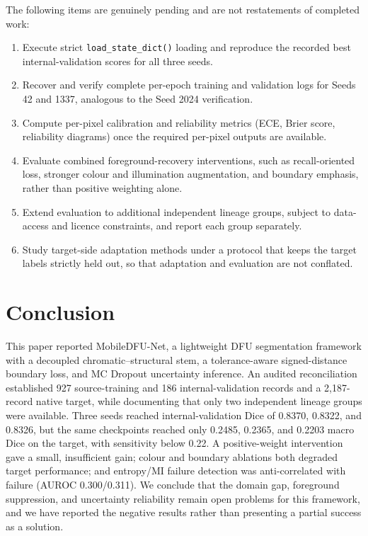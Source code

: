 \documentclass[conference]{IEEEtran}
\begin{document}
The following items are genuinely pending and are not restatements of completed work:
\begin{enumerate}
\item Execute strict \texttt{load\_state\_dict()} loading and reproduce the recorded best internal-validation scores for all three seeds.
\item Recover and verify complete per-epoch training and validation logs for Seeds 42 and 1337, analogous to the Seed 2024 verification.
\item Compute per-pixel calibration and reliability metrics (ECE, Brier score, reliability diagrams) once the required per-pixel outputs are available.
\item Evaluate combined foreground-recovery interventions, such as recall-oriented loss, stronger colour and illumination augmentation, and boundary emphasis, rather than positive weighting alone.
\item Extend evaluation to additional independent lineage groups, subject to data-access and licence constraints, and report each group separately.
\item Study target-side adaptation methods under a protocol that keeps the target labels strictly held out, so that adaptation and evaluation are not conflated.
\end{enumerate}

\section{Conclusion}
\label{sec:conclusion}

This paper reported MobileDFU-Net, a lightweight DFU segmentation framework with a decoupled chromatic--structural stem, a tolerance-aware signed-distance boundary loss, and MC Dropout uncertainty inference. An audited reconciliation established 927 source-training and 186 internal-validation records and a 2,187-record native target, while documenting that only two independent lineage groups were available. Three seeds reached internal-validation Dice of 0.8370, 0.8322, and 0.8326, but the same checkpoints reached only 0.2485, 0.2365, and 0.2203 macro Dice on the target, with sensitivity below 0.22. A positive-weight intervention gave a small, insufficient gain; colour and boundary ablations both degraded target performance; and entropy/MI failure detection was anti-correlated with failure (AUROC 0.300/0.311). We conclude that the domain gap, foreground suppression, and uncertainty reliability remain open problems for this framework, and we have reported the negative results rather than presenting a partial success as a solution.
\end{document}
